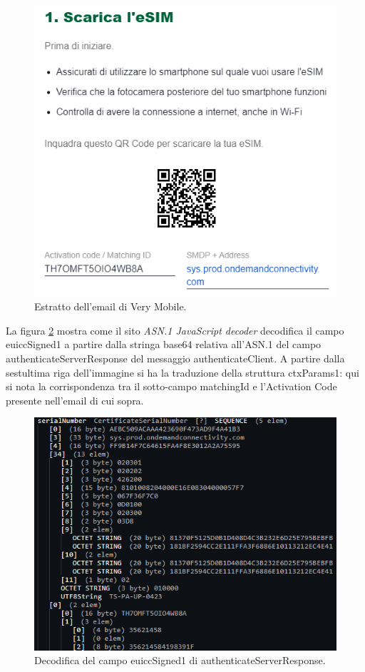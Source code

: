 \documentclass[10pt, oneside]{book}
\begin{document}
\begin{figure}
\includegraphics[width=\linewidth]{email.png}
\caption{Estratto dell'email di Very Mobile.}
\label{fig:email}
\end{figure}
La figura \ref{fig:decode-euiccSigned1} mostra come il sito \textit{ASN.1 JavaScript decoder} decodifica il campo euiccSigned1 a partire dalla stringa base64 relativa all'ASN.1 del campo authenticateServerResponse del messaggio authenticateClient. A partire dalla sestultima riga dell'immagine si ha la traduzione della struttura ctxParams1: qui si nota la corrispondenza tra il sotto-campo matchingId e l'Activation Code presente nell'email di cui sopra.
\begin{figure}
\includegraphics[width=\linewidth]{decode-euiccSigned1.png}
\caption{Decodifica del campo euiccSigned1 di authenticateServerResponse.}
\label{fig:decode-euiccSigned1}
\end{figure}
\end{document}
